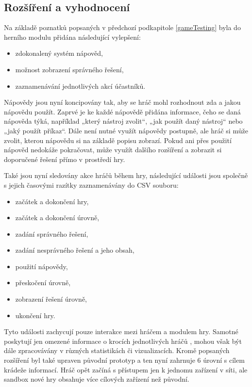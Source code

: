 \documentclass[
  digital, %
  oneside, %
  table,   %
  nolof,     %
  nolot,     %
]{fithesis3}
\begin{document}
\subsection{Rozšíření a vyhodnocení} \label{gameExtensions}
Na základě poznatků popsaných v předchozí podkapitole \ref{gameTesting} byla do herního modulu přidána následující vylepšení:
\begin{itemize}
  \item zdokonalený systém nápověd,
  \item možnost zobrazení správného řešení,
  \item zaznamenávání jednotlivých akcí účastníků.
\end{itemize}
Nápovědy jsou nyní koncipovány tak, aby se hráč mohl rozhodnout zda a jakou nápovědu použít. Zaprvé je ke každé nápovědě přidána informace, čeho se daná nápověda týká, například „který nástroj zvolit“, „jak použít daný nástroj“ nebo „jaký použít příkaz“. Dále není nutné využít nápovědy postupně, ale hráč si může zvolit, kterou nápovědu si na základě popisu zobrazí. Pokud ani přes použití nápověd nedokáže pokračovat, může využít dalšího rozšíření a zobrazit si doporučené řešení přímo v prostředí hry. \cite{ctfDesign}\par
Také jsou nyní sledovány akce hráčů během hry, následující události jsou společně s jejich časovými razítky zaznamenávány do CSV souboru:
\begin{itemize}
  \item začátek a dokončení hry,
  \item začátek a dokončení úrovně,
  \item zadání správného řešení,
  \item zadání nesprávného řešení a jeho obsah,
  \item použití nápovědy,
  \item přeskočení úrovně,
  \item zobrazení řešení úrovně,
  \item ukončení hry.
\end{itemize}
Tyto události zachycují pouze interakce mezi hráčem a modulem hry. Samotné poskytují jen omezené informace o krocích jednotlivých hráčů \cite{ctfDesign}, mohou však být dále zpracovávány v různých statistikách či vizualizacích.
Kromě popsaných rozšíření byl také upraven původní prototyp a ten nyní zahrnuje 6 úrovní s cílem krádeže informací. Hráč opět začíná s přístupem jen k jednomu zařízení v síti, ale sandbox nové hry obsahuje více cílových zařízení než původní.\par
\end{document}
